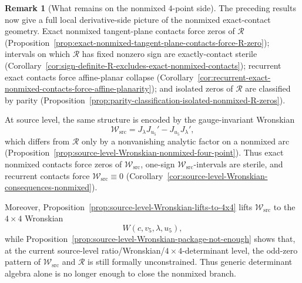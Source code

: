\documentclass[11pt,a4paper]{amsart}
\theoremstyle{plain}
\theoremstyle{definition}
\newtheorem{remark}[theorem]{Remark}
\begin{document}
\begin{remark}[What remains on the nonmixed $4$-point side]
\label{rem:what-remains-nonmixed-after-R-zero-bridge}
The preceding results now give a full local derivative-side picture of the
nonmixed exact-contact geometry. Exact nonmixed tangent-plane contacts force
zeros of $\mathcal R$
(Proposition~\ref{prop:exact-nonmixed-tangent-plane-contacts-force-R-zero});
intervals on which $\mathcal R$ has fixed nonzero sign are exactly-contact
sterile
(Corollary~\ref{cor:sign-definite-R-excludes-exact-nonmixed-contacts});
recurrent exact contacts force affine-planar collapse
(Corollary~\ref{cor:recurrent-exact-nonmixed-contacts-force-affine-planarity});
and isolated zeros of $\mathcal R$ are classified by parity
(Proposition~\ref{prop:parity-classification-isolated-nonmixed-R-zeros}).

At source level, the same structure is encoded by the gauge-invariant Wronskian
\[
\mathcal W_{\mathrm{src}}
=
J_\lambda J_{u_5}'-J_{u_5}J_\lambda',
\]
which differs from $\mathcal R$ only by a nonvanishing analytic factor on a
nonmixed arc
(Proposition~\ref{prop:source-level-Wronskian-nonmixed-four-point}). Thus exact
nonmixed contacts force zeros of $\mathcal W_{\mathrm{src}}$, one-sign
$\mathcal W_{\mathrm{src}}$-intervals are sterile, and recurrent contacts
force $\mathcal W_{\mathrm{src}}\equiv 0$
(Corollary~\ref{cor:source-level-Wronskian-consequences-nonmixed}).

Moreover, Proposition~\ref{prop:source-level-Wronskian-lifts-to-4x4} lifts
$\mathcal W_{\mathrm{src}}$ to the $4\times4$ Wronskian
\[
W(c,v_5,\lambda,u_5),
\]
while Proposition~\ref{prop:source-level-Wronskian-package-not-enough} shows
that, at the current source-level ratio/Wronskian/$4\times4$-determinant
level, the odd-zero pattern of $\mathcal W_{\mathrm{src}}$ and $\mathcal R$
is still formally unconstrained. Thus generic determinant algebra alone is no
longer enough to close the nonmixed branch.


\end{remark}
\end{document}
